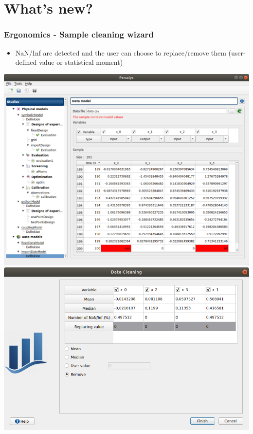\documentclass[aspectratio=169]{beamer}
\begin{document}
\section{What's new?}

\begin{frame}
  \frametitle{Ergonomics - Sample cleaning wizard}
   \begin{itemize}
   \item NaN/Inf are detected and the user can choose to replace/remove them (user-defined value or statistical moment)
   \end{itemize}
   \begin{center}
    \includegraphics[height=0.65\textheight]{figures/cleaning1.png} \includegraphics[height=0.65\textheight]{figures/cleaning2.png}
  \end{center}
\end{frame}
\end{document}
